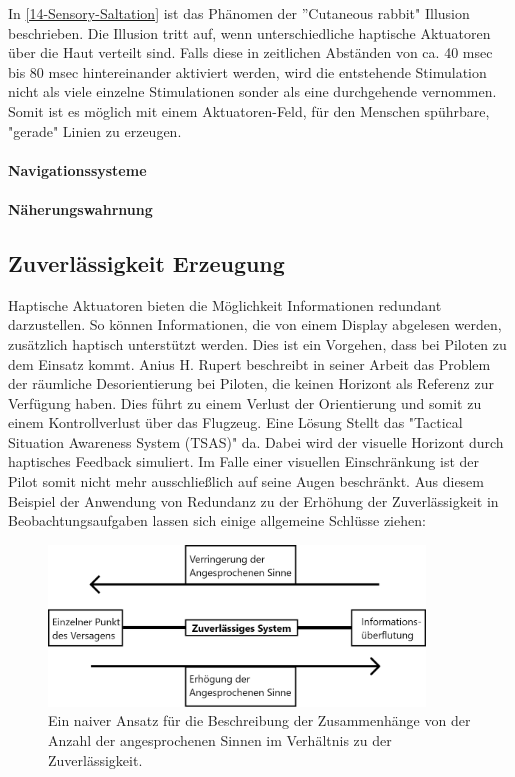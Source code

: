 \documentclass{llncs}					%
\begin{document}
In \ref{14-Sensory-Saltation} ist das Phänomen der ''Cutaneous rabbit"\cite{geldard1972cutaneous} Illusion beschrieben. Die Illusion tritt auf, wenn unterschiedliche haptische Aktuatoren über die Haut verteilt sind. Falls diese in zeitlichen Abständen von ca. 40 msec bis 80 msec hintereinander aktiviert werden, wird die entstehende Stimulation nicht als viele einzelne Stimulationen sonder als eine durchgehende vernommen. Somit ist es möglich mit einem Aktuatoren-Feld, für den Menschen spührbare, "gerade" Linien zu erzeugen.

\paragraph{Navigationssysteme}

\paragraph{Näherungswahrnung}

\subsection{Zuverlässigkeit Erzeugung}
Haptische Aktuatoren bieten die Möglichkeit Informationen redundant darzustellen. So können Informationen, die von einem Display abgelesen werden, zusätzlich haptisch unterstützt werden. Dies ist ein Vorgehen, dass bei Piloten zu dem Einsatz kommt.
Anius H. Rupert\cite{rupert2000instrumentation} beschreibt in seiner Arbeit das Problem der räumliche Desorientierung bei Piloten, die keinen Horizont als Referenz zur Verfügung haben. Dies führt zu einem Verlust der Orientierung und somit zu einem Kontrollverlust über das Flugzeug. Eine Lösung Stellt das "Tactical Situation Awareness System (TSAS)"\cite{rupert2000instrumentation} da. Dabei wird der visuelle Horizont durch haptisches Feedback simuliert\cite{rupert2000instrumentation}. Im Falle einer visuellen Einschränkung ist der Pilot somit nicht mehr ausschließlich auf seine Augen beschränkt.
Aus diesem Beispiel der Anwendung von Redundanz zu der Erhöhung der Zuverlässigkeit in Beobachtungsaufgaben lassen sich einige allgemeine Schlüsse ziehen:

\begin{figure}[htbp]
	\begin{center}
		\includegraphics[width = 10cm]{Grafiken/Sinne-Redundanz-Verhaeltnis.png}
		\caption{Ein naiver Ansatz für die Beschreibung der Zusammenhänge von der Anzahl der angesprochenen Sinnen im Verhältnis zu der Zuverlässigkeit.}
		\label{Sinne_Redundanz_Verhaeltnis}
	\end{center}
\end{figure}
\end{document}
